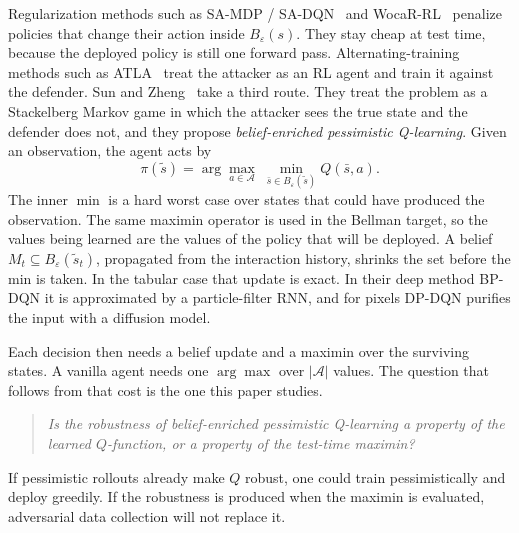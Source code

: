 \documentclass[10pt,twocolumn]{article}
\begin{document}
Regularization methods such as SA-MDP / SA-DQN~\cite{zhang2020robust} and WocaR-RL~\cite{liang2022wocar} penalize policies that change their action inside $B_\varepsilon(s)$.
They stay cheap at test time, because the deployed policy is still one forward pass.
Alternating-training methods such as ATLA~\cite{zhang2021robust} treat the attacker as an RL agent and train it against the defender.
Sun and Zheng~\cite{sun2024belief} take a third route.
They treat the problem as a Stackelberg Markov game in which the attacker sees the true state and the defender does not, and they propose \emph{belief-enriched pessimistic Q-learning}.
Given an observation, the agent acts by
\begin{equation}
\pi(\tilde s)=\arg\max_{a\in\mathcal{A}}\;\min_{\bar s\in B_\varepsilon(\tilde s)} Q(\bar s,a).
\label{eq:maximin}
\end{equation}
The inner $\min$ is a hard worst case over states that could have produced the observation.
The same maximin operator is used in the Bellman target, so the values being learned are the values of the policy that will be deployed.
A belief $M_t\subseteq B_\varepsilon(\tilde s_t)$, propagated from the interaction history, shrinks the set before the min is taken.
In the tabular case that update is exact.
In their deep method BP-DQN it is approximated by a particle-filter RNN, and for pixels DP-DQN purifies the input with a diffusion model.

Each decision then needs a belief update and a maximin over the surviving states.
A vanilla agent needs one $\arg\max$ over $|\mathcal{A}|$ values.
The question that follows from that cost is the one this paper studies.
\begin{quote}
\emph{Is the robustness of belief-enriched pessimistic Q-learning a property of the learned $Q$-function, or a property of the test-time maximin?}
\end{quote}
If pessimistic rollouts already make $Q$ robust, one could train pessimistically and deploy greedily.
If the robustness is produced when the maximin is evaluated, adversarial data collection will not replace it.
\end{document}
